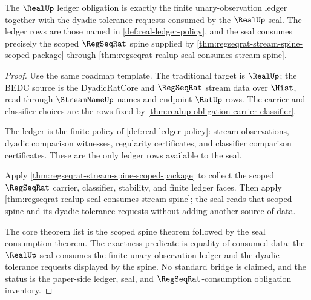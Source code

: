 \begin{theorem}
\label{thm:realup-obligation-seal-ledger}
The $\RealUp$ ledger obligation is exactly the finite unary-observation
ledger together with the dyadic-tolerance requests consumed by the
$\RealUp$ seal. The ledger rows are those named in
\autoref{def:real-ledger-policy}, and the seal consumes precisely the scoped
$\RegSeqRat$ spine supplied by
\autoref{thm:regseqrat-stream-spine-scoped-package} through
\autoref{thm:regseqrat-realup-seal-consumes-stream-spine}.
\end{theorem}
\begin{proof}
Use the same roadmap template. The traditional target is $\RealUp$; the BEDC
source is the DyadicRatCore and $\RegSeqRat$ stream data over $\Hist$, read
through $\StreamNameUp$ names and endpoint $\RatUp$ rows. The carrier and
classifier choices are the rows fixed by
\autoref{thm:realup-obligation-carrier-classifier}.

The ledger is the finite policy of
\autoref{def:real-ledger-policy}: stream observations, dyadic comparison
witnesses, regularity certificates, and classifier comparison certificates.
These are the only ledger rows available to the seal.

Apply \autoref{thm:regseqrat-stream-spine-scoped-package} to collect the
scoped $\RegSeqRat$ carrier, classifier, stability, and finite ledger faces.
Then apply \autoref{thm:regseqrat-realup-seal-consumes-stream-spine}; the
seal reads that scoped spine and its dyadic-tolerance requests without adding
another source of data.

The core theorem list is the scoped spine theorem followed by the seal
consumption theorem. The exactness predicate is equality of consumed data:
the $\RealUp$ seal consumes the finite unary-observation ledger and the
dyadic-tolerance requests displayed by the spine. No standard bridge is
claimed, and the status is the paper-side ledger, seal, and
$\RegSeqRat$-consumption obligation inventory.
\end{proof}

